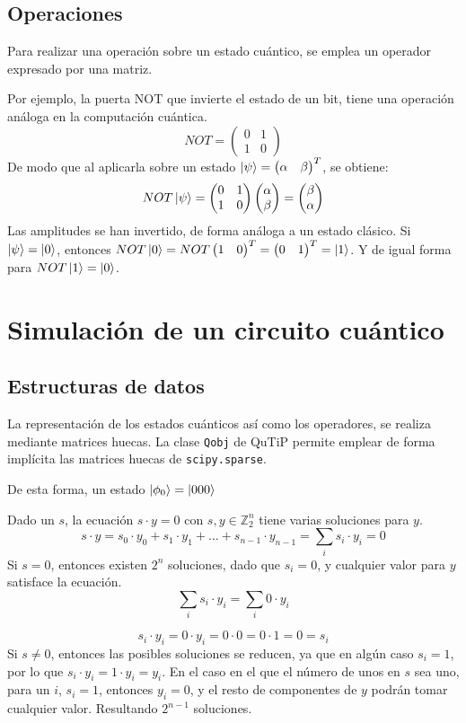 \documentclass{article}
\newcommand*\mat[1]{ \begin{pmatrix} #1 \end{pmatrix}}
\theoremstyle{definition}
\begin{document}
\subsection{Operaciones}



Para realizar una operación sobre un estado cuántico, se emplea un operador 
expresado por una matriz.

Por ejemplo, la puerta NOT que invierte el estado de un bit, tiene una operación 
análoga en la computación cuántica.
%
$$ NOT = \mat{0 & 1 \\ 1 & 0} $$
%
De modo que al aplicarla sobre un estado $\ket{\psi} = \mat{\alpha & \beta}^T$, 
se obtiene:
%
$$ NOT \ket{\psi} = \mat{0 & 1 \\ 1 & 0} \mat{\alpha \\ \beta} = \mat{\beta \\ 
\alpha} $$
%
Las amplitudes se han invertido, de forma análoga a un estado clásico. Si 
$\ket{\psi} = \ket{0}$, entonces $NOT\ket{0} = NOT \mat{1 & 0}^T = \mat{0 & 
1}^T = \ket{1}$. Y de igual forma para $NOT \ket{1} = \ket{0}$.

\newpage

\section{Simulación de un circuito cuántico}
\subsection{Estructuras de datos}
La representación de los estados cuánticos así como los operadores, se realiza
mediante matrices huecas. La clase \texttt{Qobj} de QuTiP permite emplear de
forma implícita las matrices huecas de \texttt{scipy.sparse}.

De esta forma, un estado $\ket{\phi_0} = \ket{000} $

\newpage

Dado un $s$, la ecuación $s \cdot y = 0$ con $s, y \in \mathbb Z_2^n$ tiene 
varias soluciones para $y$.
$$ s \cdot y = s_0 \cdot y_0 + s_1 \cdot y_1 + \ldots + s_{n-1} \cdot y_{n-1} = 
\sum_{i}{s_i \cdot y_i} = 0$$
Si $s = 0$, entonces existen $2^n$ soluciones, dado que $s_i = 0$, y cualquier 
valor para $y$ satisface la ecuación.
$$ \sum_{i}{s_i \cdot y_i} = \sum_{i}{0 \cdot y_i} $$

$$ s_i \cdot y_i = 0 \cdot y_i = 0 \cdot 0 = 0 \cdot 1 = 0 = s_i$$
Si $s \neq 0$, entonces las posibles soluciones se reducen, ya que en algún caso 
$s_i = 1$, por lo que $s_i \cdot y_i = 1 \cdot y_i = y_i$.
En el caso en el que el número de unos en $s$ sea uno, para un $i$, $s_i = 1$, 
entonces $y_i = 0$, y el resto de componentes de $y$ podrán tomar cualquier 
valor. Resultando $2^{n-1}$ soluciones.
\end{document}
